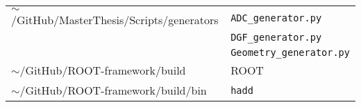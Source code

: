 \begin{tabular}{ll}
    $\sim$/GitHub/MasterThesis/Scripts/generators          & \texttt{ADC\_generator.py}              \\
                                                           & \texttt{DGF\_generator.py}              \\
                                                           & \texttt{Geometry\_generator.py}         \\
    $\sim$/GitHub/ROOT-framework/build                     & ROOT                                    \\
    $\sim$/GitHub/ROOT-framework/build/bin                 & \texttt{hadd}                           \\
    \hline
\end{tabular}